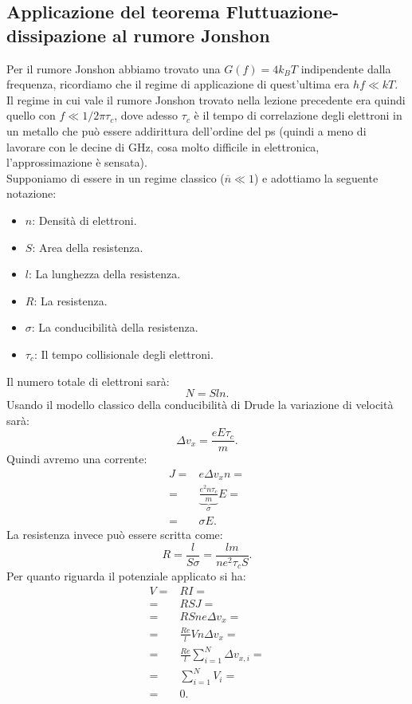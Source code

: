 \subsection{Applicazione del teorema Fluttuazione-dissipazione al rumore Jonshon}
\label{subsec:Applicazione del teorema Fluttuazione-dissipazione al rumore Jonshon}
Per il rumore Jonshon abbiamo trovato una $G(f) = 4k_B T$ indipendente dalla frequenza, ricordiamo che il regime di applicazione di quest'ultima era $hf \ll kT$.\\
Il regime in cui vale il rumore Jonshon trovato nella lezione precedente era quindi quello con $f\ll 1/2\pi\tau_c$,
dove adesso $\tau_c$ è il tempo di correlazione degli elettroni in un metallo che può essere addirittura dell'ordine del ps 
(quindi a meno di lavorare con le decine di GHz, cosa molto difficile in elettronica, l'approssimazione è sensata).\\
Supponiamo di essere in un regime classico ($\overline{n}\ll 1$) e adottiamo la seguente notazione:
\begin{itemize}
	\item $n$: Densità di elettroni.
	\item $S$: Area della resistenza.
	\item $l$: La lunghezza della resistenza.
	\item $R$: La resistenza.
	\item $\sigma$: La conducibilità della resistenza.
	\item $\tau_c$: Il tempo collisionale degli elettroni.
\end{itemize}
Il numero totale di elettroni sarà:
\[
	N= Sl n
.\] 
Usando il modello classico della conducibilità di Drude la variazione di velocità sarà:
\[
	\Delta v_x= \frac{eE \tau _c}{m}
.\] 
Quindi avremo una corrente:
\[\begin{aligned}
	J 
	=&
	e\Delta v_x n=\\
	=&
	\underbrace{\frac{e^2n\tau_c}{m}}_{\sigma}E =\\
	=&
	\sigma E
.\end{aligned}\]
La resistenza invece può essere scritta come:
\[
	R = \frac{l}{S\sigma}
	=
	\frac{l m}{n e^2 \tau_c S}
.\] 
Per quanto riguarda il potenziale applicato si ha:
\[\begin{aligned}
	V
	=&
	RI=\\
	=& 
	RSJ=\\  
	=& 
	RS ne\Delta v_x=\\
	=&
	\frac{Re}{l}Vn\Delta v_x=\\
	=&
	\frac{Re}{l} \sum_{i =1}^{N} \Delta v_{x,i}=\\
	=&
	\sum_{i=1}^{N} V_i=\\
	=&0
.\end{aligned}\]
